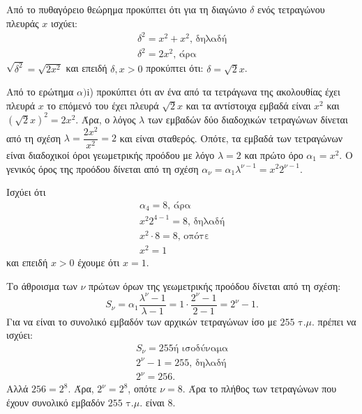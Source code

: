 
\begin{alist}
\item
\begin{rlist}
\item Από το πυθαγόρειο θεώρημα προκύπτει ότι για τη διαγώνιο $\delta$ ενός
τετραγώνου πλευράς $x$ ισχύει:
\begin{gather*}
\delta^2 = x^2 + x^2\text{, δηλαδή} \\
\delta^2 = 2x^2\text{, άρα}
\end{gather*}
$\sqrt{\delta^2} = \sqrt{2x^2}$ και επειδή $\delta, x > 0$ προκύπτει ότι:
$\delta = \sqrt{2}x$.

\item Από το ερώτημα $\alpha)$i) προκύπτει ότι αν ένα από τα τετράγωνα της ακολουθίας
έχει πλευρά $x$ το επόμενό του έχει πλευρά $\sqrt{2}x$ και τα αντίστοιχα εμβαδά
είναι $x^2$ και $(\sqrt{2}x)^2 = 2x^2$. Άρα, ο λόγος $\lambda$ των εμβαδών δύο διαδοχικών
τετραγώνων δίνεται από τη σχέση
$\lambda = \dfrac{2x^2}{x^2} = 2$
και είναι σταθερός. Οπότε, τα εμβαδά των τετραγώνων είναι διαδοχικοί όροι
γεωμετρικής προόδου με λόγο $\lambda = 2$ και πρώτο όρο $\alpha_1 = x^2$.
Ο γενικός όρος της προόδου δίνεται από τη σχέση $\alpha_\nu = \alpha_1 \lambda^{\nu-1} = x^2 2^{\nu-1}$.
\end{rlist}

\item
\begin{rlist}
\item Ισχύει ότι
\begin{gather*}
\alpha_4 = 8\text{, άρα} \\
x^2 2^{4-1} = 8\text{, δηλαδή} \\
x^2 \cdot 8 = 8\text{, οπότε} \\
x^2 = 1
\end{gather*}
και επειδή $x > 0$ έχουμε ότι $x = 1$.

\item Το άθροισμα των $\nu$ πρώτων όρων της γεωμετρικής προόδου δίνεται από τη
σχέση:
\[S_\nu = \alpha_1 \dfrac{\lambda^\nu - 1}{\lambda - 1} = 1 \cdot \dfrac{2^\nu - 1}{2 - 1} = 2^\nu - 1.\]
Για να είναι το συνολικό εμβαδόν των αρχικών τετραγώνων ίσο με $255 \text{ τ.}\mu.$
πρέπει να ισχύει:
\begin{gather*}
S_\nu = 255\text{ή ισοδύναμα} \\
2^\nu - 1 = 255\text{, δηλαδή} \\
2^\nu = 256.
\end{gather*}
Αλλά $256 = 2^8$. Άρα, $2^\nu = 2^8$, οπότε $\nu = 8$. Άρα το πλήθος των τετραγώνων
που έχουν συνολικό εμβαδόν $255 \text{ τ.}\mu.$ είναι $8$.
\end{rlist}
\end{alist}

